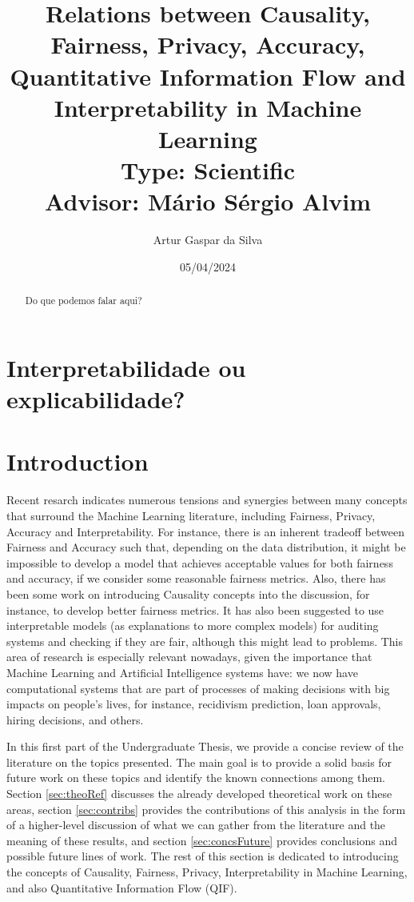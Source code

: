 \documentclass{article}
\title{Relations between Causality, Fairness, Privacy, Accuracy, Quantitative Information Flow and Interpretability in Machine Learning\large\\ Type: Scientific\\Advisor: Mário Sérgio Alvim}
\author{Artur Gaspar da Silva}
\date{05/04/2024}
\begin{document}
\maketitle

\begin{abstract}
    Do que podemos falar aqui?
\end{abstract}

\section{Interpretabilidade ou explicabilidade?}

\section{Introduction}

Recent resarch\cite{Sok}\cite{Reductions}\cite{Rachel}\cite{Awareness} indicates numerous tensions and synergies between many concepts that surround the Machine Learning literature, including Fairness, Privacy, Accuracy and Interpretability. For instance, there is an inherent tradeoff between Fairness and Accuracy such that, depending on the data distribution, it might be impossible to develop a model that achieves acceptable values for both fairness and accuracy, if we consider some reasonable fairness metrics\cite{Carlos}. Also, there has been some work on introducing Causality concepts into the discussion, for instance, to develop better fairness metrics\cite{CausalFair}. It has also been suggested to use interpretable models (as explanations to more complex models) for auditing systems and checking if they are fair, although this might lead to problems\cite{ExplainAll}. This area of research is especially relevant nowadays, given the importance that Machine Learning and Artificial Intelligence systems have: we now have computational systems that are part of processes of making decisions with big impacts on people's lives, for instance, recidivism prediction\cite{Compass}, loan approvals\cite{Loans}, hiring decisions\cite{Jobs}, and others.

In this first part of the Undergraduate Thesis, we provide a concise review of the literature on the topics presented. The main goal is to provide a solid basis for future work on these topics and identify the known connections among them. Section \ref{sec:theoRef} discusses the already developed theoretical work on these areas, section \ref{sec:contribs} provides the contributions of this analysis in the form of a higher-level discussion of what we can gather from the literature and the meaning of these results, and section \ref{sec:concsFuture} provides conclusions and possible future lines of work. The rest of this section is dedicated to introducing the concepts of Causality, Fairness, Privacy, Interpretability in Machine Learning, and also Quantitative Information Flow (QIF).
\end{document}

